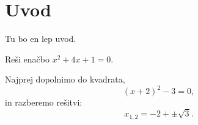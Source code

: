 \chapter{Uvod}
\label{cha:uvod}

Tu bo en lep uvod.

\begin{zgled}
  Reši enačbo $x^2 + 4 x + 1 = 0$.
\end{zgled}

\begin{resitev}
  Najprej dopolnimo do kvadrata,
  \begin{equation*}
    (x + 2)^2 - 3 = 0,
  \end{equation*}
  in razberemo rešitvi:
  \begin{equation*}
    x_{1,2} = -2 + \pm \sqrt{3}.
  \end{equation*}
\end{resitev}

